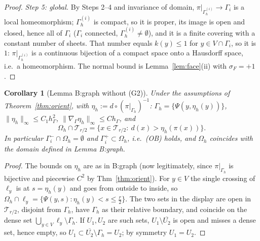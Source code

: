 \documentclass[11pt]{article}
\newtheorem{corollary}[theorem]{Corollary}
\theoremstyle{definition}
\newcommand{\hG}{h_\Gamma}
\newcommand{\Gh}{\Gamma_h}
\newcommand{\Oh}{\Omega_h}
\begin{document}
\begin{proof}
\emph{Step 5: global.} By Steps 2--4 and invariance of domain, $\pi|_{\Gamma_h^{(i)}}\to\Gamma_i$ is a local homeomorphism; $\Gamma_h^{(i)}$ is compact, so it is proper, its image is open and closed, hence all of $\Gamma_i$ ($\Gamma_i$ connected, $\Gamma_h^{(i)}\ne\emptyset$), and it is a finite covering with a constant number of sheets. That number equals $k(y)\le1$ for $y\in V\cap\Gamma_i$, so it is $1$: $\pi|_{\Gamma_h^{(i)}}$ is a continuous bijection of a compact space onto a Hausdorff space, i.e.\ a homeomorphism. The normal bound is Lemma~\ref{lem:face}(ii) with $\sigma_F=+1$.
\end{proof}

\begin{corollary}[Lemma B:graph without (G2)]\label{cor:graph}
Under the assumptions of Theorem~\ref{thm:orient}, with $\eta_h:=d\circ(\pi|_{\Gh})^{-1}$: $\Gh=\{\Psi(y,\eta_h(y))\}$, $\|\eta_h\|_\infty\le C_1\hG^2$, $\|\nabla_\Gamma\eta_h\|_\infty\le C\hG$, and
\[
\Oh\cap\mathcal T_{r/2}=\{x\in\mathcal T_{r/2}:\ d(x)>\eta_h(\pi(x))\}.
\]
In particular $\Gamma_i^-\cap\Oh=\emptyset$ and $\Gamma_i^+\subset\Oh$, i.e.\ (OB) holds, and $\Oh$ coincides with the domain \emph{defined} in Lemma B:graph.
\end{corollary}
\begin{proof}
The bounds on $\eta_h$ are as in B:graph (now legitimately, since $\pi|_{\Gh}$ is bijective and piecewise $C^2$ by Thm~\ref{thm:orient}). For $y\in V$ the single crossing of $\ell_y$ is at $s=\eta_h(y)$ and goes from outside to inside, so $\Oh\cap\ell_y=\{\Psi(y,s):\eta_h(y)<s\le\frac r2\}$. The two sets in the display are open in $\mathcal T_{r/2}$, disjoint from $\Gh$, have $\Gh$ as their relative boundary, and coincide on the dense set $\bigcup_{y\in V}\ell_y\setminus\Gh$. If $U_1,U_2$ are such sets, $U_1\setminus\overline{U_2}$ is open and misses a dense set, hence empty, so $U_1\subset\overline{U_2}\setminus\Gh=U_2$; by symmetry $U_1=U_2$.
\end{proof}
\end{document}
